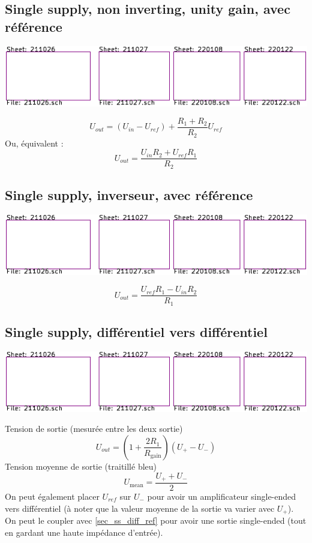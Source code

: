 \documentclass[resume]{subfiles}
\begin{document}
\begin{multicols}{3}
\subsection{Single supply, non inverting, unity gain, avec référence}
\begin{center}
\includegraphics[scale=1,page=3]{../KiCad/resume-crop.pdf}
\end{center}
$$\boxed{U_{out}=\left(U_{in}-U_{ref}\right)+\frac{R_1+R_2}{R_2}U_{ref}}$$
Ou, équivalent :
$$\boxed{U_{out}=\frac{U_{in}R_2+U_{ref}R_1}{R_2}}$$
\subsection{Single supply, inverseur, avec référence}
\begin{center}
\includegraphics[scale=1,page=4]{../KiCad/resume-crop.pdf}
\end{center}
$$\boxed{U_{out}=\frac{U_{ref}R_1-U_{in}R_2}{R_1}}$$

\subsection{Single supply, différentiel vers différentiel}
\begin{center}
\includegraphics[scale=1,page=17]{../KiCad/resume-crop.pdf}
\end{center}
Tension de sortie (mesurée entre les deux sortie)
$$\boxed{U_{out}=\left(1+\frac{2R_1}{R_{\text{gain}}}\right)\left(U_{+}-U_{-}\right)}$$
Tension moyenne de sortie (traitillé  bleu)
$$\boxed{U_{\text{mean}}=\frac{U_{+}+U_{-}}{2}}$$
On peut également placer $U_{ref}$ sur $U_{-}$ pour avoir un amplificateur single-ended vers différentiel (à noter que la valeur moyenne de la sortie va varier avec $U_{+}$).\\
On peut le coupler avec \ref{sec_ss_diff_ref} pour avoir une sortie single-ended (tout en gardant une haute impédance d'entrée).

\end{multicols}
\end{document}
